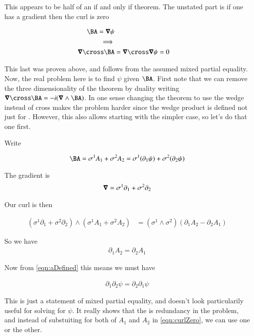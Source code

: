\documentclass{article}
\begin{document}
This appears to be half of an if and only if theorem.  The unstated part is if one has a gradient then the curl is zero

\begin{align*}
\BA = \spacegrad \psi \\
\implies \\
\spacegrad \cross \BA &= \spacegrad \cross \spacegrad \psi = 0
\end{align*}

This last was proven above, and follows from the assumed mixed partial equality.  Now, the real problem here is to find $\psi$ given $\BA$.
First note that we can remove the three dimensionality of the theorem by duality writing $\spacegrad \cross \BA = -i (\spacegrad \wedge \BA)$.
In one sense changing the theorem to use the wedge instead of cross makes the problem harder since the wedge product is defined not just
for .  However, this also allows starting with the simpler  case, so let's do that one first.

Write

\begin{align}\label{eqn:aDefined}
\BA = \sigma^1 A_1 + \sigma^2 A_2 = \sigma^1 (\partial_1 \psi) + \sigma^2 (\partial_2 \psi)
\end{align}

The gradient is
\begin{align*}
\boldsymbol{\nabla} = \sigma^1 \partial_1 + \sigma^2 \partial_2
\end{align*}

Our curl is then

\begin{align*}
(\sigma^1 \partial_1 + \sigma^2 \partial_2) \wedge (\sigma^1 A_1 + \sigma^2 A_2) 
&=
(\sigma^1 \wedge \sigma^2) (\partial_1 A_2 - \partial_2 A_1)
\end{align*}

So we have
\begin{align}\label{eqn:curlZero}
\partial_1 A_2 = \partial_2 A_1
\end{align}

Now from \ref{eqn:aDefined} this means we must have

\begin{align}
\partial_1 \partial_2 \psi = \partial_2 \partial_1 \psi
\end{align}

This is just a statement of mixed partial equality, and doesn't look particularily useful for solving for $\psi$.  It really shows that the
is redundancy in the problem, and instead of substuiting for both of $A_1$ and $A_2$
in \ref{eqn:curlZero}, we can use one or the other.
\end{document}
